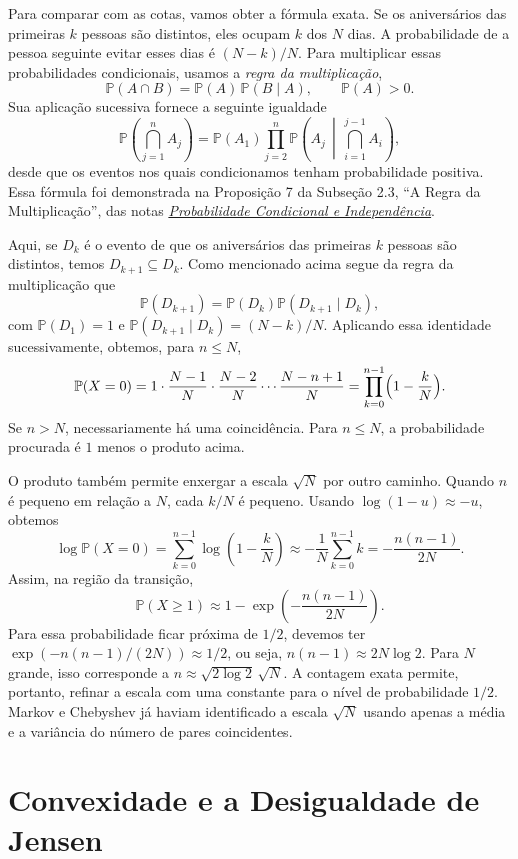 \documentclass[12pt,portuguese]{article}
\theoremstyle{definition}
\theoremstyle{plainexercise}
\theoremstyle{starredexercise}
\theoremstyle{definition}
\begin{document}
Para comparar com as cotas, vamos obter a fórmula exata. Se os aniversários
das primeiras $k$ pessoas são distintos, eles ocupam $k$ dos $N$ dias.
A probabilidade de a pessoa seguinte evitar esses dias é $(N-k)/N$.
Para multiplicar essas probabilidades condicionais, usamos a
\emph{regra da multiplicação},
\[
\mathbb{P}(A\cap B)=\mathbb{P}(A)\,\mathbb{P}(B\mid A),
\qquad \mathbb{P}(A)>0.
\]
Sua aplicação sucessiva fornece a seguinte igualdade
\[
\mathbb{P}\left(\bigcap_{j=1}^n A_j\right)
=\mathbb{P}(A_1)\prod_{j=2}^n
\mathbb{P}\left(A_j\,\middle|\,\bigcap_{i=1}^{j-1}A_i\right),
\]
desde que os eventos nos quais condicionamos tenham probabilidade positiva.
Essa fórmula foi demonstrada na Proposição 7 da Subseção 2.3,
``A Regra da Multiplicação'', das notas
\href{https://mat.unb.br/~cioletti/ensino/independencia.pdf}{\emph{Probabilidade Condicional e
Independência}}.

Aqui, se $D_k$ é o evento de que os aniversários das primeiras $k$ pessoas
são distintos, temos $D_{k+1}\subseteq D_k$. Como mencionado acima
segue da regra da multiplicação que
\[
\mathbb{P}(D_{k+1})=\mathbb{P}(D_k)\mathbb{P}(D_{k+1}\mid D_k),
\]
com $\mathbb{P}(D_1)=1$ e
$\mathbb{P}(D_{k+1}\mid D_k)=(N-k)/N$. Aplicando essa identidade
sucessivamente, obtemos, para $n\leqslant N$,
\[
\mathbb{P}(X=0)
=1\cdot\frac{N-1}{N}\cdot\frac{N-2}{N}\cdots\frac{N-n+1}{N}
=\prod_{k=0}^{n-1}\Bigl(1-\frac{k}{N}\Bigr).
\]
Se $n>N$, necessariamente há uma coincidência. Para $n\leqslant N$, a
probabilidade procurada é $1$ menos o produto acima.


\bigskip

O produto também permite enxergar a escala $\sqrt N$ por outro caminho.
Quando $n$ é pequeno em relação a $N$, cada $k/N$ é pequeno. Usando
$\log(1-u)\approx-u$, obtemos
\[
\log\mathbb{P}(X=0)
=\sum_{k=0}^{n-1}\log\left(1-\frac{k}{N}\right)
\approx-\frac1N\sum_{k=0}^{n-1}k
=-\frac{n(n-1)}{2N}.
\]
Assim, na região da transição,
\[
\mathbb{P}(X\geqslant1)
\approx1-\exp\left(-\frac{n(n-1)}{2N}\right).
\]
Para essa probabilidade ficar próxima de $1/2$, devemos ter
$\exp(-n(n-1)/(2N))\approx1/2$, ou seja,
$n(n-1)\approx2N\log2$. Para $N$ grande, isso corresponde a
$n\approx\sqrt{2\log2}\,\sqrt N$. A contagem exata permite, portanto,
refinar a escala com uma constante para o nível de probabilidade $1/2$.
Markov e Chebyshev já haviam identificado a escala $\sqrt N$ usando apenas
a média e a variância do número de pares coincidentes.

\bigskip

\section{Convexidade e a Desigualdade de Jensen}\label{sec:convexidade}
\end{document}
